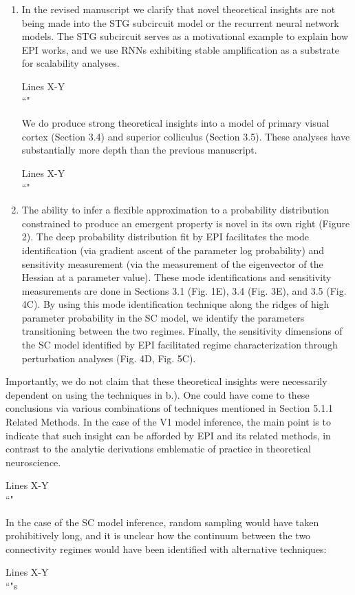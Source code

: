 \documentclass[11pt,a4paper]{article}
\begin{document}
\begin{enumerate}[label=(\alph*)]
\item  In the revised manuscript we clarify that novel theoretical insights are not being made into the STG subcircuit model or the recurrent neural network models.  The STG subcircuit serves as a motivational example to explain how EPI works, and we use RNNs exhibiting stable amplification as a substrate for scalability analyses.  

\begin{displayquote}
Lines X-Y \\
``"
\end{displayquote}

We do produce strong theoretical insights into a model of primary visual cortex (Section 3.4) and superior colliculus (Section 3.5).  These analyses have substantially more depth than the previous manuscript.

\begin{displayquote}
Lines X-Y \\
``"
\end{displayquote}

\item The ability to infer a flexible approximation to a probability distribution constrained to produce an emergent property is novel in its own right (Figure 2).  The deep probability distribution fit by EPI facilitates the mode identification (via gradient ascent of the parameter log probability) and sensitivity measurement (via the measurement of the eigenvector of the Hessian at a parameter value). These mode identifications and sensitivity measurements are done in Sections 3.1 (Fig. 1E), 3.4 (Fig. 3E), and 3.5 (Fig. 4C).  By using this mode identification technique along the ridges of high parameter probability in the SC model, we identify the parameters transitioning between the two regimes.  Finally, the sensitivity dimensions of the SC model identified by EPI facilitated regime characterization through perturbation analyses (Fig. 4D, Fig. 5C).
 
\end{enumerate}

Importantly, we do not claim that these theoretical insights were necessarily dependent on using the techniques in b.).  
One could have come to these conclusions via various combinations of techniques mentioned in Section 5.1.1 Related Methods.
In the case of the V1 model inference, the main point is to indicate that such insight can be afforded by EPI and its related methods, in contrast to the analytic derivations emblematic of practice in theoretical neuroscience.
\begin{displayquote}
Lines X-Y \\
``"
\end{displayquote}
In the case of the SC model inference, random sampling would have taken prohibitively long, and it is unclear how the continuum between the two connectivity regimes would have been identified with alternative techniques:
\begin{displayquote}
Lines X-Y \\
``"s
\end{displayquote}
 
\end{document}
